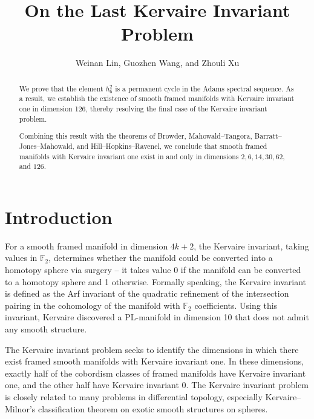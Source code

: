 \documentclass{amsart}
\title{On the Last Kervaire Invariant Problem}
\author{Weinan Lin, Guozhen Wang, and Zhouli Xu}
\date{}
\numberwithin{equation}{section}
\begin{document}
\begin{abstract}
We prove that the element $h_6^2$ is a permanent cycle in the Adams spectral sequence. As a result, we establish the existence of smooth framed manifolds with Kervaire invariant one in dimension 126, thereby resolving the final case of the Kervaire invariant problem.

Combining this result with the theorems of Browder, Mahowald--Tangora, Barratt--Jones--Mahowald, and Hill--Hopkins--Ravenel, we conclude that smooth framed manifolds with Kervaire invariant one exist in and only in dimensions  $2, 6, 14, 30, 62$, and $126$.
%
\end{abstract}

\maketitle
%
%

\section{Introduction}

%

%

%

%

%

%

%

For a smooth framed manifold in dimension $4k+2$, the Kervaire invariant, taking values in $\mathbb{F}_2$, determines whether the manifold could be converted into a homotopy sphere via surgery -- it takes value 0 if the manifold can be converted to a homotopy sphere and 1 otherwise. Formally speaking, the Kervaire invariant is defined as the Arf invariant of the quadratic refinement of the intersection pairing in the cohomology of the manifold with $\mathbb{F}_2$ coefficients. Using this invariant, Kervaire \cite{Kervaire} discovered a PL-manifold in dimension 10 that does not admit any smooth structure. 

The Kervaire invariant problem seeks to identify the dimensions in which there exist  framed smooth manifolds with Kervaire invariant one. In these dimensions, exactly half of the cobordism classes of framed manifolds have Kervaire invariant one, and the other half have Kervaire invariant 0. The Kervaire invariant problem is closely related to many problems in differential topology, especially Kervaire--Milnor's classification theorem \cite{KervaireMilnor} on exotic smooth structures on spheres. 
\end{document}

